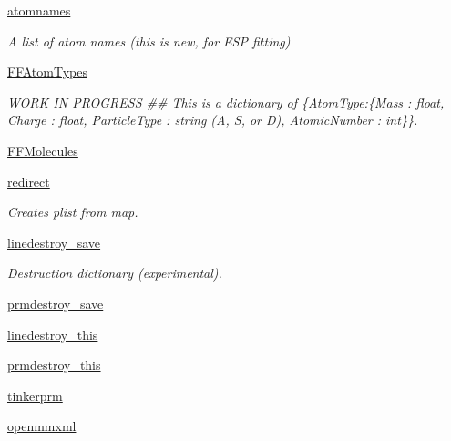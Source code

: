 \begin{DoxyCompactItemize}
\hyperlink{classsrc_1_1forcefield_1_1FF_a96fae41cef96cd26839ae1f6d43db7b5}{atomnames}
\begin{DoxyCompactList}\small\item\em A list of atom names (this is new, for E\+SP fitting) \end{DoxyCompactList}\item 
\hyperlink{classsrc_1_1forcefield_1_1FF_a7c4998b78683e8e8fb11d5de7195735f}{F\+F\+Atom\+Types}
\begin{DoxyCompactList}\small\item\em W\+O\+RK IN P\+R\+O\+G\+R\+E\+SS \#\# This is a dictionary of \{\textquotesingle{}Atom\+Type\textquotesingle{}\+:\{\textquotesingle{}Mass\textquotesingle{} \+: float, \textquotesingle{}Charge\textquotesingle{} \+: float, \textquotesingle{}Particle\+Type\textquotesingle{} \+: string (\textquotesingle{}A\textquotesingle{}, \textquotesingle{}S\textquotesingle{}, or \textquotesingle{}D\textquotesingle{}), \textquotesingle{}Atomic\+Number\textquotesingle{} \+: int\}\}. \end{DoxyCompactList}\item 
\hyperlink{classsrc_1_1forcefield_1_1FF_a301f03eb7fa12eaf1d3a0cdb4dc61030}{F\+F\+Molecules}
\item 
\hyperlink{classsrc_1_1forcefield_1_1FF_aa71d8083835edb6a8a4634747c485913}{redirect}
\begin{DoxyCompactList}\small\item\em Creates plist from map. \end{DoxyCompactList}\item 
\hyperlink{classsrc_1_1forcefield_1_1FF_abc8e6c8b6be8daf156c905f601ed6e97}{linedestroy\+\_\+save}
\begin{DoxyCompactList}\small\item\em Destruction dictionary (experimental). \end{DoxyCompactList}\item 
\hyperlink{classsrc_1_1forcefield_1_1FF_ab1398de07a7eb34f034611e3009f1800}{prmdestroy\+\_\+save}
\item 
\hyperlink{classsrc_1_1forcefield_1_1FF_acb39e08cf6d1d0d4a699a3d97047feb7}{linedestroy\+\_\+this}
\item 
\hyperlink{classsrc_1_1forcefield_1_1FF_ab147788d898448c4e6d82e1d9d0cd7fa}{prmdestroy\+\_\+this}
\item 
\hyperlink{classsrc_1_1forcefield_1_1FF_a1c8278c8003961b043c8a6301ce49e18}{tinkerprm}
\item 
\hyperlink{classsrc_1_1forcefield_1_1FF_a99c2a023158e63366935ba00d7c184dd}{openmmxml}

\end{DoxyCompactItemize}
